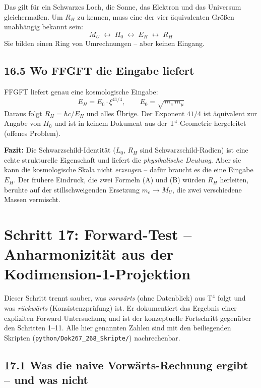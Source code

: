 Das gilt für ein Schwarzes Loch, die Sonne, das Elektron und das
Universum gleichermaßen. Um $R_H$ zu kennen, muss eine der vier
äquivalenten Größen unabhängig bekannt sein:
\[
  M_U \;\longleftrightarrow\; H_0 \;\longleftrightarrow\;
  E_H \;\longleftrightarrow\; R_H
\]
Sie bilden einen Ring von Umrechnungen -- aber keinen Eingang.

\subsection*{16.5 Wo FFGFT die Eingabe liefert}

FFGFT liefert genau eine kosmologische Eingabe:
\[
  E_H = E_0\cdot\xi^{41/4}, \qquad E_0 = \sqrt{m_e\,m_\mu}
\]
Daraus folgt $R_H = \hbar c/E_H$ und alles Übrige. Der Exponent
$41/4$ ist äquivalent zur Angabe von $H_0$ und ist in keinem
Dokument aus der T$^4$-Geometrie hergeleitet (offenes Problem).

\textbf{Fazit:} Die Schwarzschild-Identität ($L_0$, $R_H$ sind
Schwarzschild-Radien) ist eine echte strukturelle Eigenschaft und
liefert die \emph{physikalische Deutung}. Aber sie kann die
kosmologische Skala nicht \emph{erzeugen} -- dafür braucht es die
eine Eingabe $E_H$. Der frühere Eindruck, die zwei Formeln (A) und (B)
würden $R_H$ herleiten, beruhte auf der stillschweigenden Ersetzung
$m_e \to M_U$, die zwei verschiedene Massen vermischt.

\section{Schritt 17: Forward-Test -- Anharmonizität aus der Kodimension-1-Projektion}

Dieser Schritt trennt sauber, was \emph{vorwärts} (ohne Datenblick) aus
T$^4$ folgt und was \emph{rückwärts} (Konsistenzprüfung) ist. Er
dokumentiert das Ergebnis einer expliziten Forward-Untersuchung und ist
der konzeptuelle Fortschritt gegenüber den Schritten 1--11. Alle hier
genannten Zahlen sind mit den beiliegenden Skripten
(\texttt{python/Dok267\_268\_Skripte/}) nachrechenbar.

\subsection*{17.1 Was die naive Vorwärts-Rechnung ergibt -- und was nicht}

